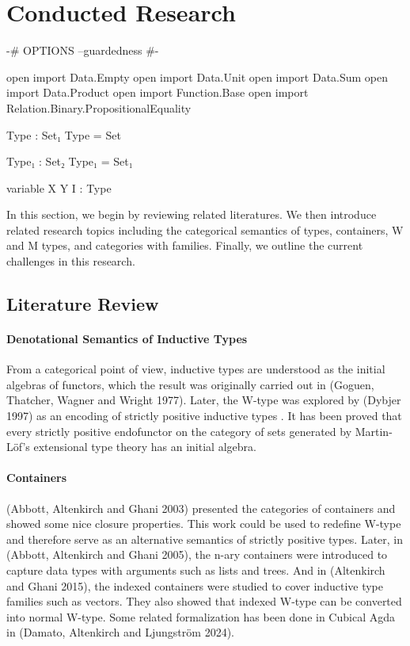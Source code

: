 \chapter{Conducted Research}

\begin{code}[hide]
{-# OPTIONS --guardedness #-}

open import Data.Empty
open import Data.Unit
open import Data.Sum
open import Data.Product
open import Function.Base
open import Relation.Binary.PropositionalEquality

Type : Set₁
Type = Set

Type₁ : Set₂
Type₁ = Set₁

variable X Y I : Type
\end{code}

In this section, we begin by reviewing related literatures. We then introduce related research topics including the categorical semantics of types, containers, W and M types, and categories with families. Finally, we outline the current challenges in this research.

\section{Literature Review}

\subsubsection*{Denotational Semantics of Inductive Types}

From a categorical point of view, inductive types are understood as the initial algebras of functors, which the result was originally carried out in (Goguen, Thatcher, Wagner and Wright 1977)\cite{goguen1977initial}. Later, the W-type was explored by (Dybjer 1997)\cite{dybjer1997representing} as an encoding of strictly positive inductive types . It has been proved that every strictly positive endofunctor on the category of sets generated by Martin-Löf's extensional type theory has an initial algebra.

\subsubsection*{Containers}

(Abbott, Altenkirch and Ghani 2003)\cite{abbott2003categories} presented the categories of containers and showed some nice closure properties. This work could be used to redefine W-type and therefore serve as an alternative semantics of strictly positive types. Later, in (Abbott, Altenkirch and Ghani 2005)\cite{abbott2005containers}, the n-ary containers were introduced to capture data types with arguments such as lists and trees. And in (Altenkirch and Ghani 2015), the indexed containers were studied to cover inductive type families such as vectors. They also showed that indexed W-type can be converted into normal W-type. Some related formalization has been done in Cubical Agda in (Damato, Altenkirch and Ljungström 2024)\cite{damato2024formalising}.


